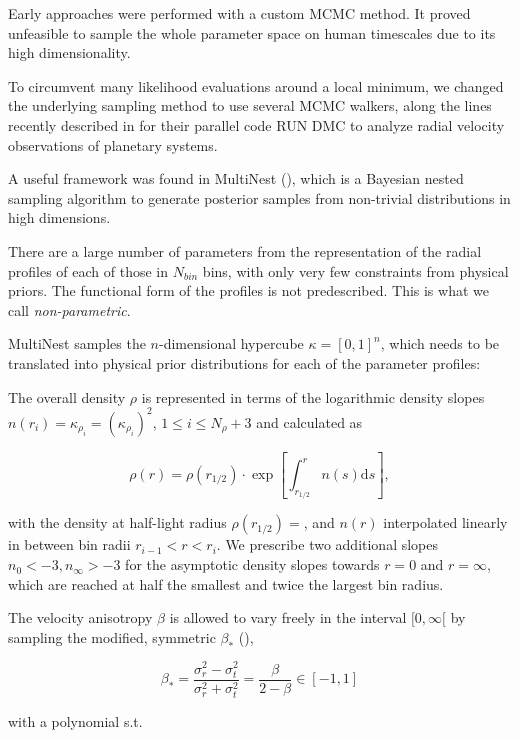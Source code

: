 Early approaches were performed with a custom MCMC method. It proved
unfeasible to sample the whole parameter space on human timescales due
to its high dimensionality.

To circumvent many likelihood evaluations around a local minimum, we
changed the underlying sampling method to use several MCMC walkers,
along the lines recently described in \citep{Nelson+2013} for their
parallel code RUN DMC to analyze radial velocity observations of
planetary systems.

A useful framework was found in MultiNest (\cite{Feroz+2009}), which
is a Bayesian nested sampling algorithm to generate posterior samples
from non-trivial distributions in high dimensions.

There are a large number of parameters from the representation of the
radial profiles of each of those in $N_{bin}$ bins, with only very few
constraints from physical priors. The functional form of the profiles
is not predescribed. This is what we call {\it non-parametric}.

MultiNest samples the $n$-dimensional hypercube $\kappa=[0,1]^n$,
which needs to be translated into physical prior distributions for
each of the parameter profiles:

The overall density $\rho$ is represented in terms of the logarithmic
density slopes $n(r_i)=\kappa_{\rho_i} = (\kappa_{\rho_i})^2$, $1\leq
i\leq N_\rho+3$ and calculated as

\begin{equation*}
    \rho(r) = \rho(r_{1/2})\cdot\exp\left[\int_{r_{1/2}}^rn(s)\text{d}s\right],
\end{equation*}

with the density at half-light radius $\rho(r_{1/2})=$, and $n(r)$
interpolated linearly in between bin radii $r_{i-1}<r<r_{i}$. We
prescribe two additional slopes $n_0 < -3, n_\infty>-3$ for the
asymptotic density slopes towards $r=0$ and $r=\infty$, which are
reached at half the smallest and twice the largest bin radius.

The velocity anisotropy $\beta$ is allowed to vary freely in the
interval $[0, \infty[$ by sampling the modified, symmetric $\beta_*$
(),

\begin{equation*}
    \beta_* = \frac{\sigma_r^2-\sigma_t^2}{\sigma_r^2+\sigma_t^2} = \frac{\beta}{2-\beta} \in [-1,1]
\end{equation*}

with a polynomial s.t.

